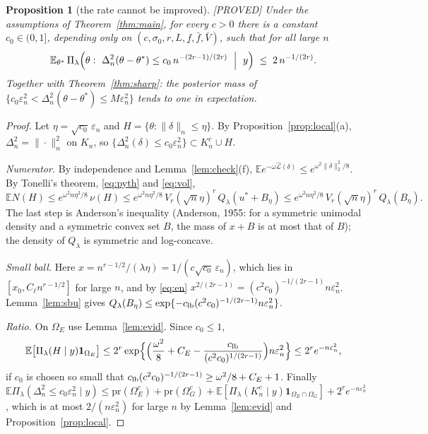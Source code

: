 \documentclass[11pt]{article}
\newtheorem{proposition}{Proposition}
\theoremstyle{definition}
\theoremstyle{remark}
\newcommand{\E}{\mathbb{E}}
\newcommand{\pr}{\mathrm{pr}}
\newcommand{\thetas}{\theta^{*}}
\newcommand{\om}{\omega}
\newcommand{\en}{\varepsilon_n}
\newcommand{\Lh}{\widehat{\mathcal L}}
\newcommand{\Ql}{Q_\lambda}
\newcommand{\fl}{\underline f}
\newcommand{\fu}{\bar f}
\newcommand{\Vb}{\bar V}
\newcommand{\nn}[1]{\|#1\|_n}
\newcommand{\ind}{\mathbf 1}
\newcommand{\proved}{\textup{[PROVED]}}
\begin{document}
\begin{proposition}[the rate cannot be improved]\label{prop:lower}\proved{}
Under the assumptions of Theorem~\ref{thm:main}, for every $c>0$ there is a constant $c_0\in(0,1]$, depending only on $(c,\sigma_0,r,L,\fl,\fu,\Vb)$, such that for all large $n$
\[
\E_{\thetas}\,\Pi_\lambda\Bigl(\theta:\ \Delta_n^2(\theta-\thetas)\le c_0\,n^{-(2r-1)/(2r)}\ \Bigm|\ y\Bigr)\;\le\;2\,n^{-1/(2r)} .
\]
Together with Theorem~\ref{thm:sharp}: the posterior mass of $\{c_0\en^2<\Delta_n^2(\theta-\thetas)\le M\en^2\}$ tends to one in expectation.
\end{proposition}

\begin{proof}
Let $\eta=\sqrt{c_0}\,\en$ and $H=\{\theta:\nn{\delta}\le\eta\}$. By Proposition~\ref{prop:local}(a), $\Delta_n^2=\nn{\cdot}^2$ on $K_n$, so $\{\Delta_n^2(\delta)\le c_0\en^2\}\subset K_n^c\cup H$.

\emph{Numerator.} By independence and Lemma~\ref{lem:check}(f), $\E e^{-\om\Lh(\delta)}\le e^{\om^2\|\delta\|_2^2/8}$. By Tonelli's theorem, \eqref{eq:pyth} and \eqref{eq:vol},
\[
\E N(H)\le e^{\om^2n\eta^2/8}\,\nu(H)\le e^{\om^2n\eta^2/8}\,V_r(\sqrt n\eta)^r\,\Ql(u^{*}+B_\eta)\le e^{\om^2n\eta^2/8}\,V_r(\sqrt n\eta)^r\,\Ql(B_\eta).
\]
The last step is Anderson's inequality (Anderson, 1955: for a symmetric unimodal density and a symmetric convex set $B$, the mass of $x+B$ is at most that of $B$); the density of $\Ql$ is symmetric and log-concave.

\emph{Small ball.} Here $x=n^{r-1/2}/(\lambda\eta)=1/(c\sqrt{c_0}\,\en)$, which lies in $[x_0,C_\ell n^{r-1/2}]$ for large $n$, and by \eqref{eq:en} $x^{2/(2r-1)}=(c^2c_0)^{-1/(2r-1)}n\en^2$. Lemma~\ref{lem:sbu} gives $\Ql(B_\eta)\le\exp\{-c_{\rm lb}(c^2c_0)^{-1/(2r-1)}n\en^2\}$.

\emph{Ratio.} On $\Omega_E$ use Lemma~\ref{lem:evid}. Since $c_0\le1$,
\[
\E\bigl[\Pi_\lambda(H\mid y)\ind_{\Omega_E}\bigr]\le2^r\exp\Bigl\{\Bigl(\frac{\om^2}8+C_E-\frac{c_{\rm lb}}{(c^2c_0)^{1/(2r-1)}}\Bigr)n\en^2\Bigr\}\le2^re^{-n\en^2},
\]
if $c_0$ is chosen so small that $c_{\rm lb}(c^2c_0)^{-1/(2r-1)}\ge\om^2/8+C_E+1$. Finally
$\E\Pi_\lambda(\Delta_n^2\le c_0\en^2\mid y)\le\pr(\Omega_E^c)+\pr(\Omega_G^c)+\E[\Pi_\lambda(K_n^c\mid y)\ind_{\Omega_E\cap\Omega_G}]+2^re^{-n\en^2}$, which is at most $2/(n\en^2)$ for large $n$ by Lemma~\ref{lem:evid} and Proposition~\ref{prop:local}.
\end{proof}
\end{document}
